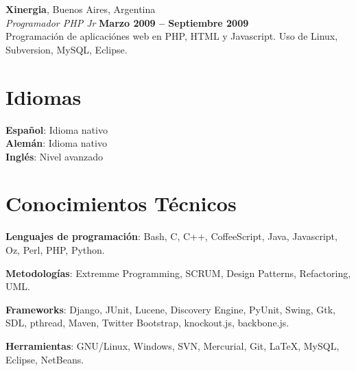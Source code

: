 \documentclass[margin,line]{resume}
\begin{document}
\begin{resume}
    \textbf{Xinergia}, Buenos Aires, Argentina \vspace{2mm}\\\vspace{1mm}%
    \textsl{Programador PHP Jr} \hfill \textbf{Marzo 2009 -- Septiembre 2009}\\
	Programación de aplicaciónes web en PHP, HTML y Javascript. Uso de Linux, Subversion, MySQL, Eclipse.
    \section{\mysidestyle Idiomas} 

	\textbf{Español}: Idioma nativo	 \\
	\textbf{Alemán}: Idioma nativo   \\
	\textbf{Inglés}: Nivel avanzado \\

    \section{\mysidestyle Conocimientos Técnicos} 

	\textbf{Lenguajes de programación}: Bash, C, C++, CoffeeScript, Java, Javascript, Oz, Perl, PHP, Python.

	\textbf{Metodologías}: Extremme Programming, SCRUM, Design Patterns, Refactoring, UML.

	\textbf{Frameworks}: Django, JUnit, Lucene, Discovery Engine, PyUnit, Swing, Gtk, SDL, pthread, Maven, Twitter Bootstrap, knockout.js, backbone.js.

	\textbf{Herramientas}: GNU/Linux, Windows, SVN, Mercurial, Git, \LaTeX , MySQL, Eclipse, NetBeans.

\end{resume}
\end{document}
